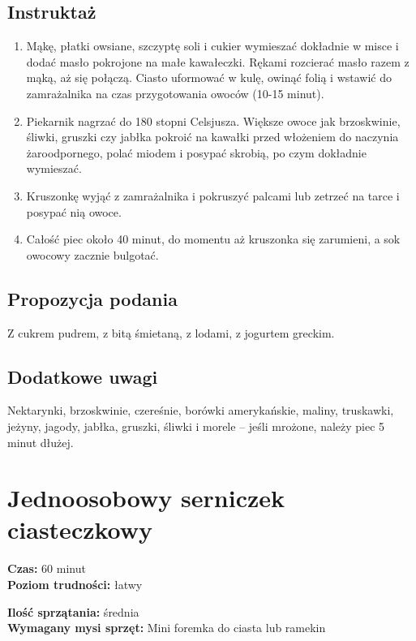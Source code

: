 \documentclass[a4paper,10pt]{book}
\begin{document}
\vspace{0.5cm} 

\subsection*{Instruktaż}
\begin{enumerate}
    \item Mąkę, płatki owsiane, szczyptę soli i cukier wymieszać dokładnie w misce i dodać masło pokrojone na małe kawałeczki. Rękami rozcierać masło razem z mąką, aż się połączą. Ciasto uformować w kulę, owinąć folią i wstawić do zamrażalnika na czas przygotowania owoców (10-15 minut).
    \item Piekarnik nagrzać do 180 stopni Celsjusza. Większe owoce jak brzoskwinie, śliwki, gruszki czy jabłka pokroić na kawałki przed włożeniem do naczynia żaroodpornego, polać miodem i posypać skrobią, po czym dokładnie wymieszać. 
    \item Kruszonkę wyjąć z zamrażalnika i pokruszyć palcami lub zetrzeć na tarce i posypać nią owoce.
    \item Całość piec około 40 minut, do momentu aż kruszonka się zarumieni, a sok owocowy zacznie bulgotać. 
\end{enumerate}

\vspace{0.5cm} 

\small
\subsection*{Propozycja podania}
Z cukrem pudrem, z bitą śmietaną, z lodami, z jogurtem greckim.

\vspace{0.3cm}

\subsection*{Dodatkowe uwagi}
Nektarynki, brzoskwinie, czereśnie, borówki amerykańskie, maliny, truskawki, jeżyny, jagody, jabłka, gruszki, śliwki i morele – jeśli mrożone, należy piec 5 minut dłużej.

\newpage 

\section{Jednoosobowy serniczek ciasteczkowy}
\bigskip
\small
\begin{minipage}{0.45\textwidth}
    \noindent \textbf{Czas:} 60 minut \\
    \textbf{Poziom trudności:} łatwy
\end{minipage}
\begin{minipage}{0.45\textwidth}
    \noindent \textbf{Ilość sprzątania:} średnia\\
    \textbf{Wymagany mysi sprzęt:} Mini foremka do ciasta lub ramekin 
\end{minipage}
\normalsize
\vspace{0.5cm}
\end{document}
